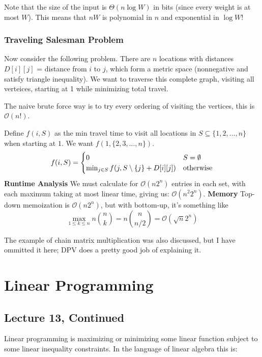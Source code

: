 Note that the size of the input is $\Theta(n \log W)$ in bits (since every weight
is at most $W$). This means that $nW$ is polynomial in $n$ and exponential in $\log W$!

\subsubsection{Traveling Salesman Problem}
Now consider the following problem. There are $n$ locations with distances $D[i][j]$ = distance from $i$ to $j$,
which form a metric space (nonnegative and satisfy triangle inequality). We want to traverse this complete graph, visiting all verteices, starting
at 1 while minimizing total travel.

The naive brute force way is to try every ordering of visiting the vertices, this is $\mathcal{O}(n!)$.

\begin{algothm}[TSP]
    Define $f(i, S)$ as the min travel time to visit all locations in $S \subseteq \{1, 2, \dots, n\}$ when starting at $1$.
    We want $f(1, \{2, 3, \dots, n\})$.
    \[ f(i, S) = \begin{cases} 0 & S = \emptyset \\
        \min_{j \in S} f\qty(j, S \setminus \{j\} + D[i][j]) & \text{otherwise} \end{cases} \]
    \textbf{Runtime Analysis} We must calculate for $\mathcal{O}(n 2^n)$ entries in each set, with each maximum taking at most linear time, giving us:
    $\mathcal{O}(n^2 2^n)$.
    \textbf{Memory} Top-down memoization is $\mathcal{O}(n 2^n)$, but with bottom-up, it's
    something like
    \[ \max_{1 \leq k \leq n} n \binom{n}{k} = n \binom{n}{n/2} = \mathcal{O}(\sqrt{n} 2^n) \]
\end{algothm}

The example of chain matrix multiplication was also discussed, but I have ommitted it here; DPV does a pretty good job of explaining it.

\section{Linear Programming}
\subsection{Lecture 13, Continued}
Linear programming is maximizing or minimizing some linear function subject to some linear inequality constraints.
In the language of linear algebra this is:

